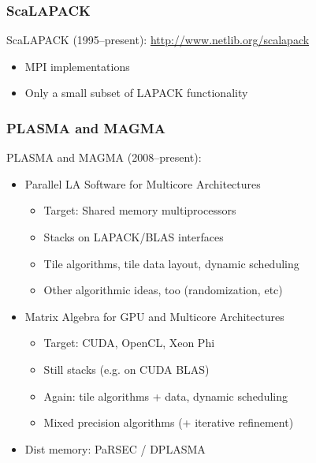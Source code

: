 \documentclass{beamer}
\begin{document}
\begin{frame}
  \frametitle{ScaLAPACK}

  ScaLAPACK (1995--present): \url{http://www.netlib.org/scalapack}
  \begin{itemize}
  \item MPI implementations
  \item Only a small subset of LAPACK functionality
  \end{itemize}
\end{frame}


\begin{frame}
  \frametitle{PLASMA and MAGMA}

  PLASMA and MAGMA (2008--present):
  \begin{itemize}
  \item Parallel LA Software for Multicore Architectures
    \begin{itemize}
    \item Target: Shared memory multiprocessors
    \item Stacks on LAPACK/BLAS interfaces
    \item Tile algorithms, tile data layout, dynamic scheduling
    \item Other algorithmic ideas, too (randomization, etc)
    \end{itemize}
  \item Matrix Algebra for GPU and Multicore Architectures
    \begin{itemize}
    \item Target: CUDA, OpenCL, Xeon Phi
    \item Still stacks (e.g. on CUDA BLAS)
    \item Again: tile algorithms + data, dynamic scheduling
    \item Mixed precision algorithms (+ iterative refinement)
    \end{itemize}
  \item Dist memory: PaRSEC / DPLASMA
  \end{itemize}
\end{frame}
\end{document}
